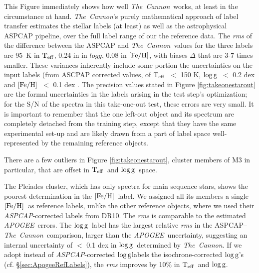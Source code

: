 \documentclass[12pt, preprint]{aastex}
\newcommand{\teff}{\mbox{$\rm T_{eff}$}}
\newcommand{\feh}{\mbox{$\rm [Fe/H]$}}
\newcommand{\logg}{\mbox{$\rm \log g$}}
\newcommand{\tc}{\textsl{The~Cannon}}
\newcommand{\apogee}{\textsl{APOGEE}}
\newcommand{\aspcap}{\textsl{ASPCAP}}
\begin{document}
This Figure immediately shows how well \tc\ works, at least in the circumstance at hand.
\tc 's purely mathematical approach of label transfer estimates the stellar labels (at least) as well as the astrophysical ASPCAP pipeline,
over the full label range of our the reference data. The \textit{rms} of the difference between the ASPCAP and \tc\ values for the three labels are
95~K in $\teff$, 0.24 in in $logg$, 0.08 in $\feh$, with biases $\Delta$ that are 3-7 times smaller.  
These variances inherently include some portion the uncertainties on the input labels (from ASCPAP corrected values, 
of \teff\ $<$ 150 K, \logg\ $<$ 0.2 dex and \feh\ $<$ 0.1 dex \citep{Meszaros2013}.
The precision values stated in Figure \ref{fig:takeonestarout} are the formal uncertainties in the labels arising 
in the test step's optimization; for the S/N of the spectra in this take-one-out test, these errors are very small.
It is important to remember that the one left-out object and its spectrum are completely detached from the training step, 
except that they have the same experimental set-up and are likely drawn from a part of label space well-represented by the remaining reference objects.

There are a few outliers in Figure \ref{fig:takeonestarout}, cluster members of M3 in particular, that are offset in \teff\ and \logg\ space. 

The Pleiades cluster, which has only spectra for main sequence stars, shows the poorest determination in the \feh\ label. We assigned all its members a single \feh ~as reference labels, unlike the other reference objects, where we used their \aspcap -corrected labels from DR10.
The \textit{rms} is comparable to the estimated \apogee\ errors. The \logg\ label has the largest relative \textit{rms} in the ASPCAP--\tc\ comparison, larger than the \apogee\ uncertainty, suggesting an internal uncertainty of $<$ 0.1 dex in \logg\ determined by \tc.
If we adopt instead of \aspcap -corrected \logg labels the isochrone-corrected \logg 's (cf. \S \ref{sec:ApogeeRefLabels}), the \textit{rms} improves by 10\% in \teff\ and \logg .


\end{document}
